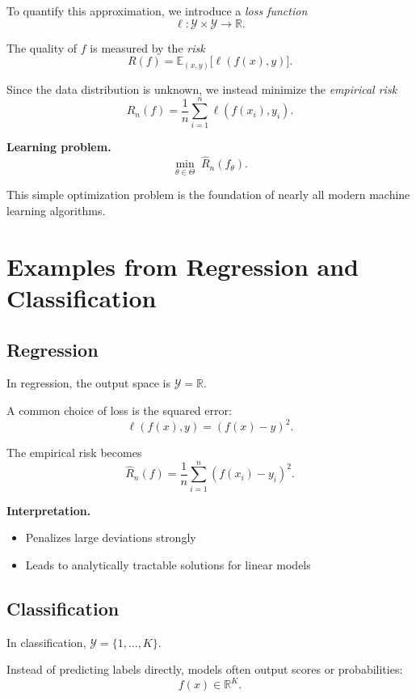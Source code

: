 \medskip

\noindent
To quantify this approximation, we introduce a \emph{loss function}
\[
\ell : \mathcal{Y} \times \mathcal{Y} \to \mathbb{R}.
\]

The quality of $f$ is measured by the \emph{risk}
\[
R(f) = \mathbb{E}_{(x,y)} \big[ \ell(f(x), y) \big].
\]

Since the data distribution is unknown, we instead minimize the \emph{empirical risk}
\[
\hat{R}_n(f) = \frac{1}{n} \sum_{i=1}^n \ell(f(x_i), y_i).
\]

\medskip

\noindent
\textbf{Learning problem.}
\[
\min_{\theta \in \Theta} \; \hat{R}_n(f_\theta).
\]

\medskip

This simple optimization problem is the foundation of nearly all modern machine learning algorithms.

\section{Examples from Regression and Classification}

\subsection{Regression}

In regression, the output space is $\mathcal{Y} = \mathbb{R}$.

A common choice of loss is the squared error:
\[
\ell(f(x), y) = (f(x) - y)^2.
\]

The empirical risk becomes
\[
\hat{R}_n(f) = \frac{1}{n} \sum_{i=1}^n (f(x_i) - y_i)^2.
\]

\medskip

\noindent
\textbf{Interpretation.}
\begin{itemize}
    \item Penalizes large deviations strongly
    \item Leads to analytically tractable solutions for linear models
\end{itemize}

\subsection{Classification}

In classification, $\mathcal{Y} = \{1, \dots, K\}$.

Instead of predicting labels directly, models often output scores or probabilities:
\[
f(x) \in \mathbb{R}^K.
\]

